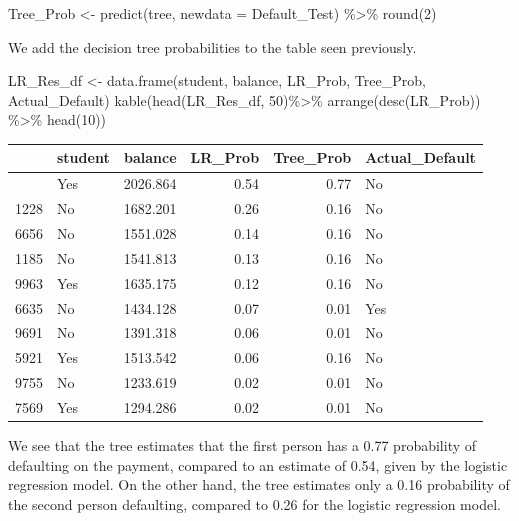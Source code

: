 \documentclass[
  letterpaper,
  DIV=11,
  numbers=noendperiod]{scrreprt}
\newenvironment{Shaded}{\begin{snugshade}}{\end{snugshade}}
\newcommand{\AttributeTok}[1]{\textcolor[rgb]{0.40,0.45,0.13}{#1}}
\newcommand{\DecValTok}[1]{\textcolor[rgb]{0.68,0.00,0.00}{#1}}
\newcommand{\FunctionTok}[1]{\textcolor[rgb]{0.28,0.35,0.67}{#1}}
\newcommand{\NormalTok}[1]{\textcolor[rgb]{0.00,0.23,0.31}{#1}}
\newcommand{\OtherTok}[1]{\textcolor[rgb]{0.00,0.23,0.31}{#1}}
\newcommand{\SpecialCharTok}[1]{\textcolor[rgb]{0.37,0.37,0.37}{#1}}
\begin{document}
\begin{Shaded}
\begin{Highlighting}[]
\NormalTok{Tree\_Prob }\OtherTok{\textless{}{-}} \FunctionTok{predict}\NormalTok{(tree, }\AttributeTok{newdata =}\NormalTok{ Default\_Test) }\SpecialCharTok{\%\textgreater{}\%} \FunctionTok{round}\NormalTok{(}\DecValTok{2}\NormalTok{)}
\end{Highlighting}
\end{Shaded}

We add the decision tree probabilities to the table seen previously.

\begin{Shaded}
\begin{Highlighting}[]
\NormalTok{LR\_Res\_df }\OtherTok{\textless{}{-}} \FunctionTok{data.frame}\NormalTok{(student, balance, LR\_Prob, Tree\_Prob, Actual\_Default)}
\FunctionTok{kable}\NormalTok{(}\FunctionTok{head}\NormalTok{(LR\_Res\_df, }\DecValTok{50}\NormalTok{)}\SpecialCharTok{\%\textgreater{}\%} \FunctionTok{arrange}\NormalTok{(}\FunctionTok{desc}\NormalTok{(LR\_Prob)) }\SpecialCharTok{\%\textgreater{}\%} \FunctionTok{head}\NormalTok{(}\DecValTok{10}\NormalTok{))}
\end{Highlighting}
\end{Shaded}

\begin{longtable}[]{@{}llrrrl@{}}
\toprule\noalign{}
& student & balance & LR\_Prob & Tree\_Prob & Actual\_Default \\
\midrule\noalign{}
\endhead
\bottomrule\noalign{}
\endlastfoot
2465 & Yes & 2026.864 & 0.54 & 0.77 & No \\
1228 & No & 1682.201 & 0.26 & 0.16 & No \\
6656 & No & 1551.028 & 0.14 & 0.16 & No \\
1185 & No & 1541.813 & 0.13 & 0.16 & No \\
9963 & Yes & 1635.175 & 0.12 & 0.16 & No \\
6635 & No & 1434.128 & 0.07 & 0.01 & Yes \\
9691 & No & 1391.318 & 0.06 & 0.01 & No \\
5921 & Yes & 1513.542 & 0.06 & 0.16 & No \\
9755 & No & 1233.619 & 0.02 & 0.01 & No \\
7569 & Yes & 1294.286 & 0.02 & 0.01 & No \\
\end{longtable}

We see that the tree estimates that the first person has a 0.77
probability of defaulting on the payment, compared to an estimate of
0.54, given by the logistic regression model. On the other hand, the
tree estimates only a 0.16 probability of the second person defaulting,
compared to 0.26 for the logistic regression model.
\end{document}

